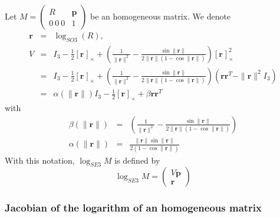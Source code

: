 \documentclass {article}
\newcommand\rot{\mathbf{r}}
\newcommand\rcross[1]{[\rot_{#1}]_{\times}}
\newcommand\normr{\|\rot\|}
\newcommand\logSO[1]{\log_{SO#1}}
\newcommand\logSE[1]{\log_{SE#1}}
\begin{document}
Let $M = \left(\begin {array}{cc} R& \mathbf{p} \\ 0\ 0\ 0 & 1\end{array}\right)$ be an homogeneous matrix.
We denote
\begin{eqnarray}
\mathbf{r} &=& \logSO{3} (R),\\
\label{eq:V}
V &=& I_3 -\frac{1}{2}\rcross{} +  \left(\frac{1}{\normr^2} - \frac{\sin\normr}{2\normr(1-\cos\normr)}\right)\rcross{}^2\\
&=&I_3 -\frac{1}{2}\rcross{} +  \left(\frac{1}{\normr^2} - \frac{\sin\normr}{2\normr(1-\cos\normr)}\right)(\mathbf{r}\mathbf{r}^T - \normr^2 I_3)\\
&=& \alpha (\normr)I_3 - \frac{1}{2}\rcross{} + \beta \mathbf{r}\mathbf{r}^T
\end{eqnarray}
with
\begin{eqnarray*}
\beta(\normr)&=&\left(\frac{1}{\normr^2} - \frac{\sin\normr}{2\normr(1-\cos\normr)}\right)\\
\alpha (\normr) &=& \frac{\normr\sin\normr}{2(1-\cos\normr)}
\end{eqnarray*}
With this notation, $\logSE{3} M$ is defined by
\begin{equation}\label{eq:logSE3}
\logSE{3} M = \left(\begin{array}{c} V\mathbf{p} \\ \mathbf{r}\end{array}\right)
\end{equation}

\subsubsection {Jacobian of the logarithm of an homogeneous matrix}
\end{document}
